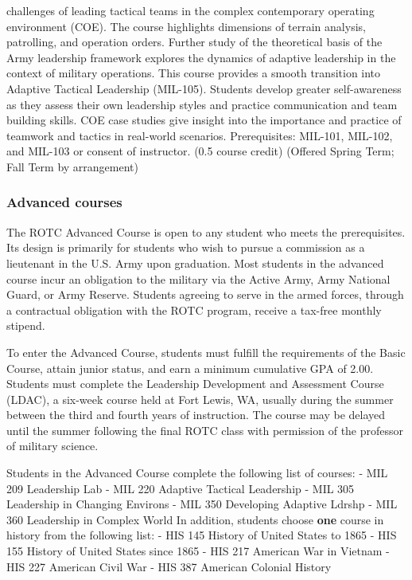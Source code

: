 \documentclass[
  letterpaper,
]{scrbook}
\begin{document}
\begin{itemize}
  challenges of leading tactical teams in the complex contemporary
  operating environment (COE). The course highlights dimensions of
  terrain analysis, patrolling, and operation orders. Further study of
  the theoretical basis of the Army leadership framework explores the
  dynamics of adaptive leadership in the context of military operations.
  This course provides a smooth transition into Adaptive Tactical
  Leadership (MIL-105). Students develop greater self-awareness as they
  assess their own leadership styles and practice communication and team
  building skills. COE case studies give insight into the importance and
  practice of teamwork and tactics in real-world scenarios.
  Prerequisites: MIL-101, MIL-102, and MIL-103 or consent of instructor.
  (0.5 course credit) (Offered Spring Term; Fall Term by arrangement)
\end{itemize}

\subsubsection*{Advanced courses}\label{advanced-courses}

The ROTC Advanced Course is open to any student who meets the
prerequisites. Its design is primarily for students who wish to pursue a
commission as a lieutenant in the U.S. Army upon graduation. Most
students in the advanced course incur an obligation to the military via
the Active Army, Army National Guard, or Army Reserve. Students agreeing
to serve in the armed forces, through a contractual obligation with the
ROTC program, receive a tax-free monthly stipend.

To enter the Advanced Course, students must fulfill the requirements of
the Basic Course, attain junior status, and earn a minimum cumulative
GPA of 2.00. Students must complete the Leadership Development and
Assessment Course (LDAC), a six-week course held at Fort Lewis, WA,
usually during the summer between the third and fourth years of
instruction. The course may be delayed until the summer following the
final ROTC class with permission of the professor of military science.

Students in the Advanced Course complete the following list of courses:
- MIL 209 Leadership Lab - MIL 220 Adaptive Tactical Leadership - MIL
305 Leadership in Changing Environs - MIL 350 Developing Adaptive Ldrshp
- MIL 360 Leadership in Complex World In addition, students choose
\textbf{one} course in history from the following list: - HIS 145
History of United States to 1865 - HIS 155 History of United States
since 1865 - HIS 217 American War in Vietnam - HIS 227 American Civil
War - HIS 387 American Colonial History
\end{document}
